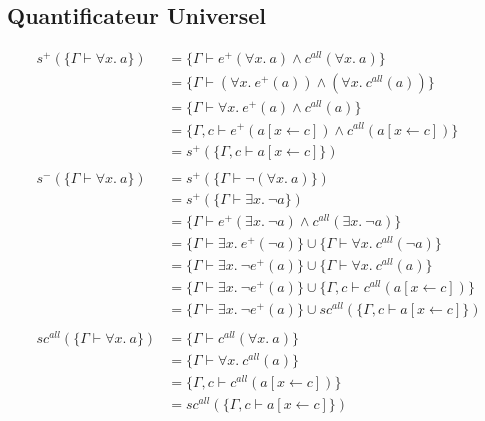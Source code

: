 \documentclass[12pt]{article}
\begin{document}
\subsection*{Quantificateur Universel}
\begin{align*}
  s^+ (\{\Gamma \vdash \forall x.~ a\})      & = \{\Gamma \vdash e^+(\forall x.~ a) \land c^{all} (\forall x.~ a)\}                             \\
                                             & = \{\Gamma \vdash (\forall x.~ e^+(a)) \land (\forall x.~ c^{all} (a))\}                         \\
                                             & = \{\Gamma \vdash \forall x.~ e^+(a) \land c^{all} (a)\}                                         \\
                                             & = \{\Gamma, c \vdash e^+(a[x\leftarrow c]) \land c^{all} (a[x\leftarrow c])\}                    \\
                                             & = s^+ (\{\Gamma, c \vdash a[x\leftarrow c]\})                                                    \\
  \\
  s^- (\{\Gamma \vdash \forall x.~ a\})      & = s^+ (\{\Gamma \vdash \neg (\forall x.~ a)\})                                                   \\
                                             & = s^+ (\{\Gamma \vdash \exists x.~ \neg a\})                                                     \\
                                             & = \{\Gamma \vdash e^+(\exists x.~ \neg a) \land c^{all} (\exists x.~ \neg a)\}                   \\
                                             & = \{\Gamma \vdash \exists x.~ e^+(\neg a)\} \cup \{\Gamma \vdash \forall x.~ c^{all}(\neg a)\}   \\
                                             & = \{\Gamma \vdash \exists x.~ \neg e^+(a)\} \cup \{\Gamma \vdash \forall x.~ c^{all} (a)\}       \\
                                             & = \{\Gamma \vdash \exists x.~ \neg e^+(a)\} \cup \{\Gamma, c\vdash c^{all} (a[x\leftarrow c])\}  \\
                                             & = \{\Gamma \vdash \exists x.~ \neg e^+(a)\} \cup sc^{all} (\{\Gamma, c\vdash a[x\leftarrow c]\}) \\
  \\
  sc^{all} (\{\Gamma \vdash \forall x.~ a\}) & = \{\Gamma \vdash c^{all}(\forall x.~ a)\}                                                       \\
                                             & = \{\Gamma \vdash \forall x.~ c^{all}(a)\}                                                       \\
                                             & = \{\Gamma, c\vdash c^{all}(a[x\leftarrow c])\}                                                  \\
                                             & = sc^{all} (\{\Gamma, c\vdash a[x\leftarrow c]\})
\end{align*}
\end{document}
